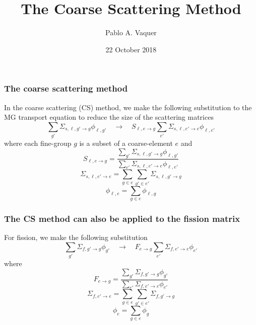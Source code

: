 \documentclass[xcolor=dvipsnames]{beamer}
\title{The Coarse Scattering Method}
\author{{\Large Pablo A. Vaquer} \vspace{-0.75cm}}
\date{{22 October 2018}}
\begin{document}
\begin{frame}
    \titlepage 
    \begin{center}
    \end{center}    
\end{frame}


\begin{frame}
\frametitle{The coarse scattering method}

\pause

In the coarse scattering (CS) method, we make the following substitution to the MG transport equation to reduce the size of the scattering matrices
\begin{equation*}
\label{eq:scatter}
\sum_{g'} \Sigma_{s,\ell,g'\to g} \phi_{\ell,g'} \quad \to \quad S_{\ell,e\to g} \sum_{e'} \Sigma_{s,\ell,e'\to e} \phi_{\ell,e'} 
\end{equation*}
where each fine-group $g$ is a subset of a coarse-element $e$ and
\begin{equation*}
\label{Eq.S}
S_{\ell,e\to g}  = \frac{\sum_{g'} \Sigma_{s,\ell,g'\to g} \phi_{\ell,g'}}{ \sum_{e'} \Sigma_{s,\ell,e'\to e} \phi_{\ell,e'}} 
\end{equation*}
\begin{equation*}
\Sigma_{s,\ell,e'\to e} = \sum_{g \in e} \sum_{g' \in e'} \Sigma_{s,\ell,g'\to g} 
\end{equation*}
\begin{equation*}
\phi_{\ell,e} = \sum_{g \in e} \phi_{\ell,g} 
\end{equation*}

\end{frame}

\begin{frame}
\frametitle{The CS method can also be applied to the fission matrix}


For fission, we make the following substitution
\begin{equation*}
\label{eq:fission}
\sum_{g'} \Sigma_{f,g'\to g} \phi_{g'} \quad \to \quad  F_{e\to g} \sum_{e'} \Sigma_{f,e'\to e} \phi_{e'} 
\end{equation*}
where 
\begin{equation*}
\label{Eq.S}
F_{e\to g}  = \frac{\sum_{g'} \Sigma_{f,g'\to g} \phi_{g'}}{ \sum_{e'} \Sigma_{f,e'\to e} \phi_{e'}} 
\end{equation*}
\begin{equation*}
\Sigma_{f,e'\to e} = \sum_{g \in e} \sum_{g' \in e'} \Sigma_{f,g'\to g}
\end{equation*}
\begin{equation*}
\phi_{e} = \sum_{g \in e} \phi_{g} 
\end{equation*}

\end{frame}
\end{document}
